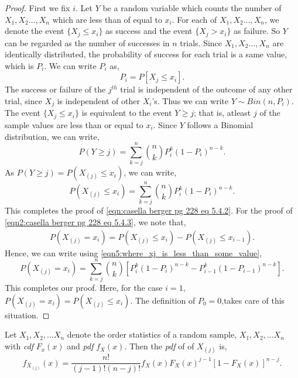 \documentclass[a4paper,english,12pt]{article}
\begin{document}
\begin{proof}
First we fix $i$. Let $Y$ be a random variable which counts the number of $X_1,X_2 \ldots,X_n$ which are less than of equal to $x_i$. For each of $X_1,X_2 \ldots,X_n$, we denote the event $\{X_j \leq x_i\}$ as success and the event $\{X_j>x_i\}$ as failure. So $Y$ can be regarded as the number of successes in $n$ trials. Since $X_1,X_2 \ldots,X_n$  are identically distributed, the probability of success for each trial is a same value, which is $P_i$. We can write $P_i$ as,
\begin{equation}
P_i=P[X_j \leq x_i].
\end{equation}
The success or failure of the $j^{th}$ trial is independent of the outcome of any other trial, since $X_j$ is independent of other $X_{i}$'s. Thus we can write $Y \sim Bin(n,P_i)$. \\
The event $\{X_j \leq x_i\}$ is equivalent to the event ${Y \geq j}$; that is, atleast $j$ of the sample values are less than or equal to $x_i$. Since $Y$ follows a Binomial distribution, we can write,
\begin{equation} \label{eq4:eqn_where_Y_is_more_than_some_value}
P(Y \geq j)={\sum\limits_{k=j}^n} \binom{n}{k} P_i ^{k} (1-P_i)^{n-k}.
\end{equation}
As $P(Y \geq j)=P(X_{(j)} \leq x_i)$, we can write,
\begin{equation} \label{eqn5:where_xj_is_less_than_some_value}
P(X_{(j)} \leq x_i)={\sum\limits_{k=j}^n} \binom{n}{k} P_i ^{k} (1-P_i)^{n-k}.
\end{equation}
This completes the proof of \eqref{eqn:casella berger pg 228 eq 5.4.2}. For the proof of \eqref{eqn2:casella berger pg 228 eq 5.4.3}, we note that, 
\begin{align}
P(X_{(j)} = x_i)= P(X_{(j)} \leq x_i)-P(X_{(j)} \leq x_{i-1}). \nonumber
\end{align}
Hence, we can write using \eqref{eqn5:where_xj_is_less_than_some_value},
\begin{equation}
P(X_{(j)} = x_i)={\sum\limits_{k=j}^n} \binom{n}{k} [P_i ^{k} (1-P_i)^{n-k} - P_{i-1} ^{k} (1-P_{i-1})^{n-k}].
\end{equation}
This completes our proof. Here, for the case $i=1$, $P(X_{(j)} = x_i)=P(X_{(j)} \leq x_i)$. The definition of $P_0=0$,takes care of this situation.
\end{proof}
\begin{thm}
Let $X_{1},X_{2}, \dots X_{n}$ denote the order statistics of a random sample, $X_1,X_2, \dots X_n$ with {\it cdf} $F_x (x)$ and {\it pdf} $f_X (x)$. Then the {\it pdf} of of $X_{(j)}$ is,
\begin{equation}
f_{X_{(j)}} (x)= \frac{n!}{(j-1)!(n-j)!} f_X (x) F_X (x) ^{j-1} [1 - F_X (x)]^{n-j}.
\end{equation}
\end{thm}
\end{document}

